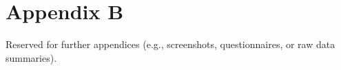 \chapter{Appendix B}\label{app:B}

Reserved for further appendices (e.g., screenshots, questionnaires, or raw data summaries).
